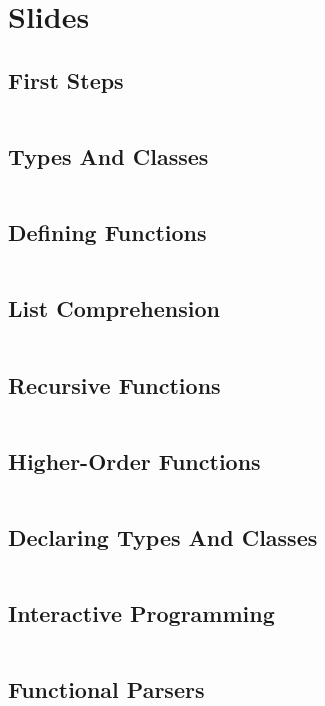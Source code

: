 \documentclass[a4paper,9pt,twoside]{book}
\newcommand{\hsfile}[1]{\inputminted[breaklines]{haskell}{../haskell/#1.hs}}
\begin{document}
\chapter{Slides}
\section{First Steps}
\hsfile{slides/1_first_steps}
\section{Types And Classes}
\hsfile{slides/2_types_and_classes}
\section{Defining Functions}
\hsfile{slides/3_defining_functions}
\section{List Comprehension}
\hsfile{slides/4_list_comprehension}
\section{Recursive Functions}
\hsfile{slides/5_recursive_functions}
\section{Higher-Order Functions}
\hsfile{slides/6_higher-order_functions}
\section{Declaring Types And Classes}
\hsfile{slides/7_declaring_types_and_classes}
\section{Interactive Programming}
\hsfile{slides/8_interactive_programming}
\section{Functional Parsers}
\hsfile{slides/9_functional_parsers}
\end{document}
